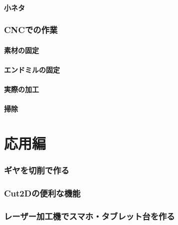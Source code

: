 \documentclass[b5paper, 9pt, twocolumn, titlepage]{jsbook}%
\begin{document}
\subsection{小ネタ}

\section{CNCでの作業}
\subsection{素材の固定}
\subsection{エンドミルの固定}
\subsection{実際の加工}
\subsection{掃除}

\part{応用編}
\section{ギヤを切削で作る }
\section{Cut2Dの便利な機能}
\section{レーザー加工機でスマホ・タブレット台を作る}



\end{document}

